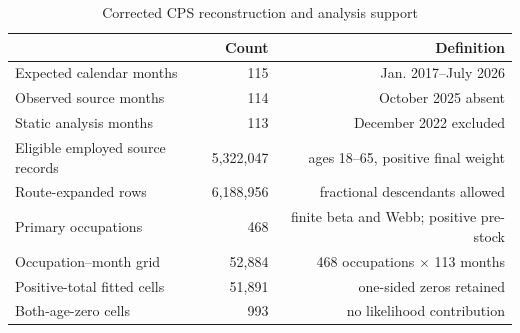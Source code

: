 \begin{table}[!htbp]
\centering
\caption{Corrected CPS reconstruction and analysis support}\label{tab:data}
\begin{tabular}{lrr}
\toprule
 & Count & Definition \\
\midrule
Expected calendar months & 115 & Jan. 2017--July 2026 \\
Observed source months & 114 & October 2025 absent \\
Static analysis months & 113 & December 2022 excluded \\
Eligible employed source records & 5,322,047 & ages 18--65, positive final weight \\
Route-expanded rows & 6,188,956 & fractional descendants allowed \\
Primary occupations & 468 & finite beta and Webb; positive pre-stock \\
Occupation--month grid & 52,884 & 468 occupations $\times$ 113 months \\
Positive-total fitted cells & 51,891 & one-sided zeros retained \\
Both-age-zero cells & 993 & no likelihood contribution \\
\bottomrule
\end{tabular}
\end{table}
